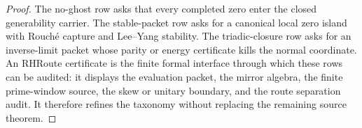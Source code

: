 \begin{proof}
The no-ghost row asks that every completed zero enter the closed
generability carrier.  The stable-packet row asks for a canonical local
zero island with Rouch\'e capture and Lee--Yang stability.  The
triadic-closure row asks for an inverse-limit packet whose parity or
energy certificate kills the normal coordinate.  An RHRoute certificate
is the finite formal interface through which these rows can be audited:
it displays the evaluation packet, the mirror algebra, the finite
prime-window source, the skew or unitary boundary, and the route
separation audit.  It therefore refines the taxonomy without replacing
the remaining source theorem.
\end{proof}
